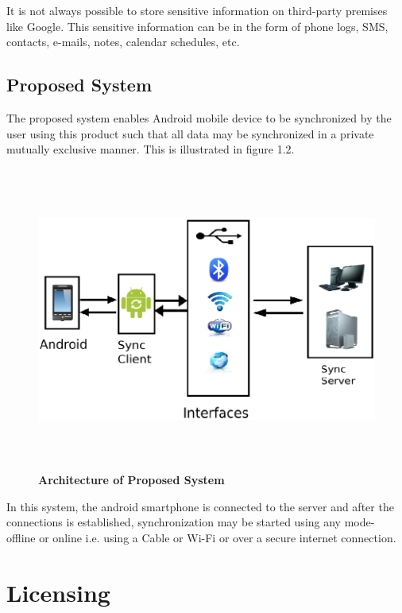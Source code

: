 It is not always possible to store sensitive information on third-party premises 
like Google. This sensitive information can be in the form of phone logs, SMS, 
contacts, e-mails, notes, calendar schedules, etc.

\subsection{Proposed System}
\hspace*{0.82cm}The proposed system enables Android mobile device to be synchronized by the user
using this product such that all data may be synchronized in a private mutually exclusive
manner. This is illustrated in figure 1.2.

\begin{figure}[H]
  \centering
    \includegraphics[height= 10cm, width=15cm]{project/images/architecture-proposed}
  \caption{\textbf{Architecture of Proposed System}}
\end{figure}

In this system, the android smartphone is connected to the server and after the
connections is established, synchronization may be started using any mode- offline or online
i.e. using a Cable or Wi-Fi or over a secure internet connection.
\newpage
\section{Licensing}
